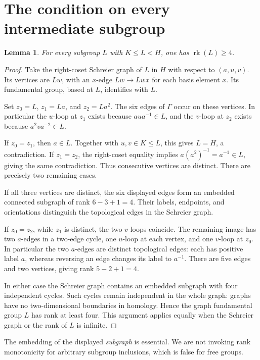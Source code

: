 \documentclass[11pt,a4paper]{article}
\newtheorem{lemma}[theorem]{Lemma}
\newcommand{\rk}{\operatorname{rk}}
\begin{document}
\section{The condition on every intermediate subgroup}
\begin{lemma}\label{lem:intermediate}
For every subgroup $L$ with $K\leq L<H$, one has $\rk(L)\geq4$.
\end{lemma}
\begin{proof}
Take the right-coset Schreier graph of $L$ in $H$ with respect to $(a,u,v)$. Its vertices are $Lw$, with an $x$-edge $Lw\to Lwx$ for each basis element $x$. Its fundamental group, based at $L$, identifies with $L$.

Set $z_0=L$, $z_1=La$, and $z_2=La^2$. The six edges of $\Gamma$ occur on these vertices. In particular the $u$-loop at $z_1$ exists because $aua^{-1}\in L$, and the $v$-loop at $z_2$ exists because $a^2va^{-2}\in L$.

If $z_0=z_1$, then $a\in L$. Together with $u,v\in K\leq L$, this gives $L=H$, a contradiction. If $z_1=z_2$, the right-coset equality implies $a(a^2)^{-1}=a^{-1}\in L$, giving the same contradiction. Thus consecutive vertices are distinct. There are precisely two remaining cases.

If all three vertices are distinct, the six displayed edges form an embedded connected subgraph of rank $6-3+1=4$. Their labels, endpoints, and orientations distinguish the topological edges in the Schreier graph.

If $z_0=z_2$, while $z_1$ is distinct, the two $v$-loops coincide. The remaining image has two $a$-edges in a two-edge cycle, one $u$-loop at each vertex, and one $v$-loop at $z_0$. In particular the two $a$-edges are distinct topological edges: each has positive label $a$, whereas reversing an edge changes its label to $a^{-1}$. There are five edges and two vertices, giving rank $5-2+1=4$.

In either case the Schreier graph contains an embedded subgraph with four independent cycles. Such cycles remain independent in the whole graph: graphs have no two-dimensional boundaries in homology. Hence the graph fundamental group $L$ has rank at least four. This argument applies equally when the Schreier graph or the rank of $L$ is infinite.
\end{proof}

The embedding of the displayed \emph{subgraph} is essential. We are not invoking rank monotonicity for arbitrary subgroup inclusions, which is false for free groups.
\end{document}
